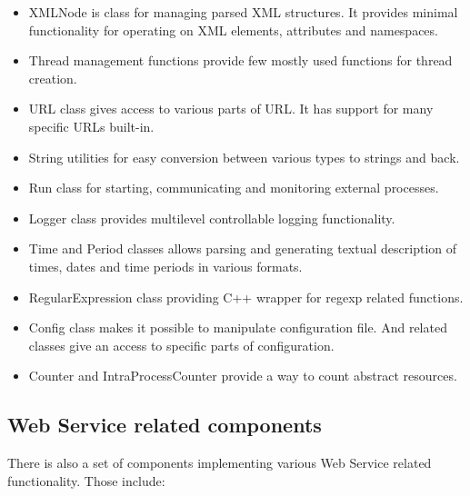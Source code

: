 \documentclass{book}
\begin{document}
\begin{itemize}

\item XMLNode is class for managing parsed XML structures. It provides minimal functionality for operating on XML elements, attributes and namespaces.

\item Thread management functions provide few mostly used functions for thread creation.

\item URL class gives access to various parts of URL. It has support for many specific URLs built-in.

\item String utilities for easy conversion between various types to strings and back.

\item Run class for starting, communicating and monitoring external processes.

\item Logger class provides multilevel controllable logging functionality.

\item Time and Period classes allows parsing and generating textual description of times, dates and time periods in various formats.

\item RegularExpression class providing C++ wrapper for regexp related functions.

\item Config class makes it possible to manipulate configuration file. And related classes give an access to specific parts of configuration.

\item Counter and IntraProcessCounter provide a way to count abstract resources.

\end{itemize}


\subsection{Web Service related components}

There is also a set of components implementing various Web Service related functionality. Those include:
\end{document}
